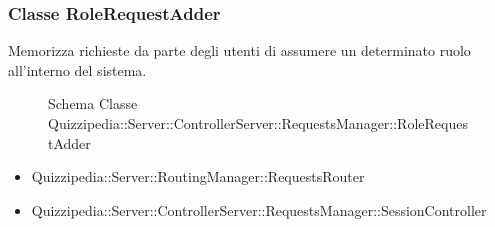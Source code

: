 \subsubsection{Classe RoleRequestAdder}
Memorizza richieste da parte degli utenti di assumere un determinato ruolo all'interno del sistema.
\begin{figure}[H]
\centering
\noindent{}
\caption{Schema Classe Quizzipedia::Server::ControllerServer::RequestsManager::RoleRequestAdder}
\end{figure}
\begin{itemize}
\item Quizzipedia::Server::RoutingManager::RequestsRouter
\end{itemize}
\begin{itemize}
\item Quizzipedia::Server::ControllerServer::RequestsManager::SessionController
\end{itemize}
